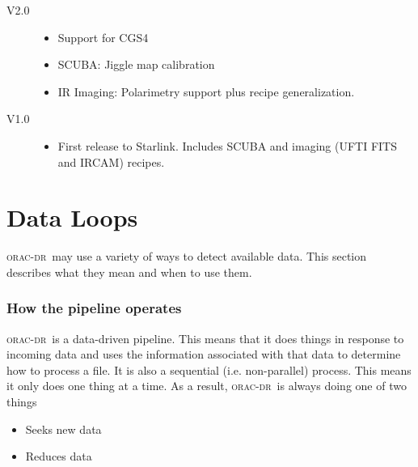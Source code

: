 \documentclass[twoside,11pt]{article}
\renewcommand{\_}{\texttt{\symbol{95}}}
\newcommand{\oracdr}{\textsc{orac-dr}}
\begin{document}
\begin{description}
\item[V2.0]

\begin{itemize}

\item Support for CGS4

\item SCUBA: Jiggle map calibration

\item IR Imaging: Polarimetry support plus recipe generalization.

\end{itemize}

\item[V1.0]

\begin{itemize}

\item First release to Starlink. Includes SCUBA and imaging (UFTI FITS
and IRCAM) recipes.

\end{itemize}

\end{description}


\appendix


\section{Data Loops\label{Data_Loops}}

\oracdr\ may use a variety of ways to detect available data. This
section describes what they mean and when to use them.

\subsubsection*{How the pipeline operates\label{The_ORAC-DR_Data_Loops_How_the_pipeline_operates}}

\oracdr\ is a data-driven pipeline. This means that it does things in
response to incoming data and uses the information associated with
that data to determine how to process a file. It is also a sequential
(i.e. non-parallel) process. This means it only does one thing at a
time. As a result, \oracdr\ is always doing one of two things

\begin{itemize}
\item 

Seeks new data

\item 

Reduces data

\end{itemize}
\end{document}
